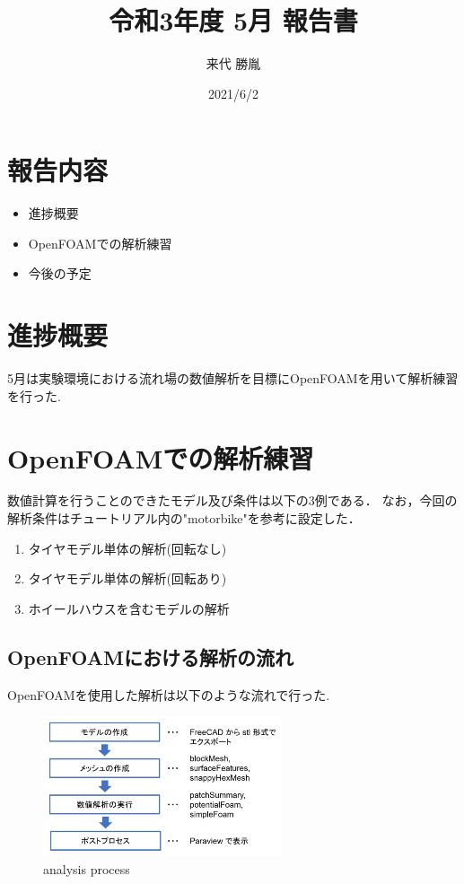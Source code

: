 \documentclass[twocolumn,a4j]{jsarticle}
\author{来代 勝胤}
\title{令和3年度 5月 報告書}
\date{2021/6/2}
\begin{document}
\maketitle
\section*{\large 報告内容}
\begin{itemize}
    \item 進捗概要
    \item OpenFOAMでの解析練習
    \item 今後の予定
\end{itemize}
\section{\large 進捗概要}
5月は実験環境における流れ場の数値解析を目標にOpenFOAMを用いて解析練習を行った.
\section{\large OpenFOAMでの解析練習}
数値計算を行うことのできたモデル及び条件は以下の3例である．
なお，今回の解析条件はチュートリアル内の"motorbike"を参考に設定した．
\renewcommand{\labelenumi}{(\alph{enumi})}
\begin{enumerate}
    \item タイヤモデル単体の解析(回転なし)
    \item タイヤモデル単体の解析(回転あり)
    \item ホイールハウスを含むモデルの解析
\end{enumerate}
\subsection{OpenFOAMにおける解析の流れ}
OpenFOAMを使用した解析は以下のような流れで行った.
\begin{figure}[htbp]
    \begin{center}
        \includegraphics[width=70mm]{images/image_1.jpg}
        \caption{analysis process}
    \end{center}
\end{figure}
\end{document}

